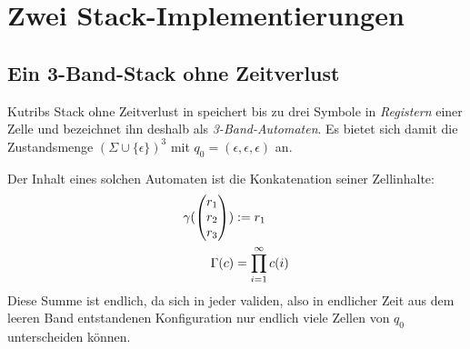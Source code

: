 \documentclass{article}
\begin{document}
\section{Zwei Stack-Implementierungen}

\subsection{Ein 3-Band-Stack ohne Zeitverlust}

Kutribs Stack ohne Zeitverlust in \cite{kutrib08} speichert bis zu drei Symbole in \emph{Registern} einer Zelle und bezeichnet ihn deshalb als \emph{3-Band-Automaten}. Es bietet sich damit die Zustandsmenge $(\Sigma \cup \{\epsilon\})^3$ mit $q_0 = (\epsilon,\epsilon,\epsilon)$ an.

Der Inhalt eines solchen Automaten ist die Konkatenation seiner Zellinhalte:
\begin{align*}
    \gamma(\begin{pmatrix}r_1\\r_2\\r_3\end{pmatrix}) &:= r_1 \\
    \Gamma(c) &= \prod^\infty_{i=1} c(i)
\end{align*}
Diese Summe ist endlich, da sich in jeder validen, also in endlicher Zeit aus dem leeren Band entstandenen Konfiguration nur endlich viele Zellen von $q_0$ unterscheiden können.
\end{document}
